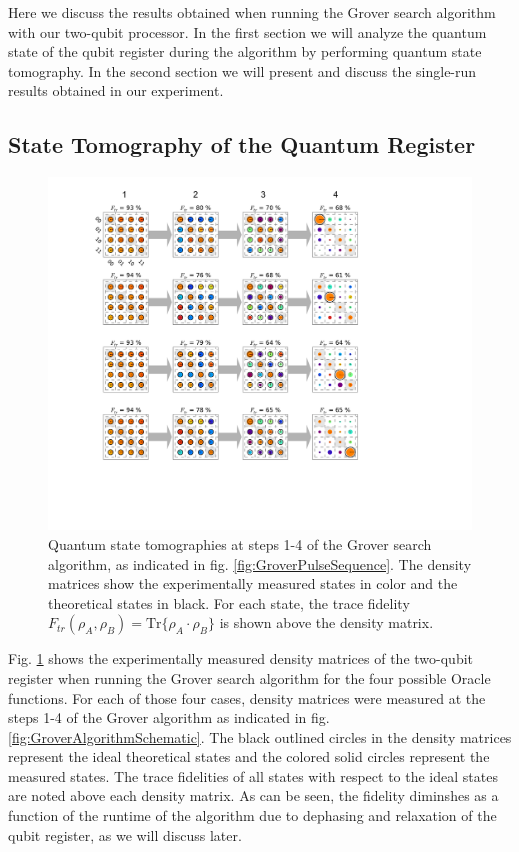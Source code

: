Here we discuss the results obtained when running the Grover search algorithm with our two-qubit processor. In the first section we will analyze the quantum state of the qubit register during the algorithm by performing quantum state tomography. In the second section we will present and discuss the single-run results obtained in our experiment.

\subsection{State Tomography of the Quantum Register}

\begin{figure}[ht!]
	\centering
		\includegraphics[width=1.\textwidth]{"./data/ct5/2011_04_21 - grover and tomo/good_data/grover algorithm - single run results - density matrices only"}
	\caption[Quantum state tomographies at different steps during the Grover search algorithm and single-run outcome probabilities]{Quantum state tomographies at steps 1-4 of the Grover search algorithm, as indicated in fig. \ref{fig:GroverPulseSequence}. The density matrices show the experimentally measured states in color and the theoretical states in black. For each state, the trace fidelity $F_{tr}(\rho_A,\rho_B) = \mathrm{Tr}\{\rho_A\cdot\rho_B\}$ is shown above the density matrix.}
	\label{fig:GroverAlgorithmExperimentalResults}
\end{figure}

Fig. \ref{fig:GroverAlgorithmExperimentalResults} shows the experimentally measured density matrices of the two-qubit register when running the Grover search algorithm for the four possible Oracle functions. For each of those four cases, density matrices were measured at the steps 1-4 of the Grover algorithm as indicated in fig. \ref{fig:GroverAlgorithmSchematic}. The black outlined circles in the density matrices represent the ideal theoretical states and the colored solid circles represent the measured states. The trace fidelities of all states with respect to the ideal states are noted above each density matrix. As can be seen, the fidelity diminshes as a function of the runtime of the algorithm due to dephasing and relaxation of the qubit register, as we will discuss later.

